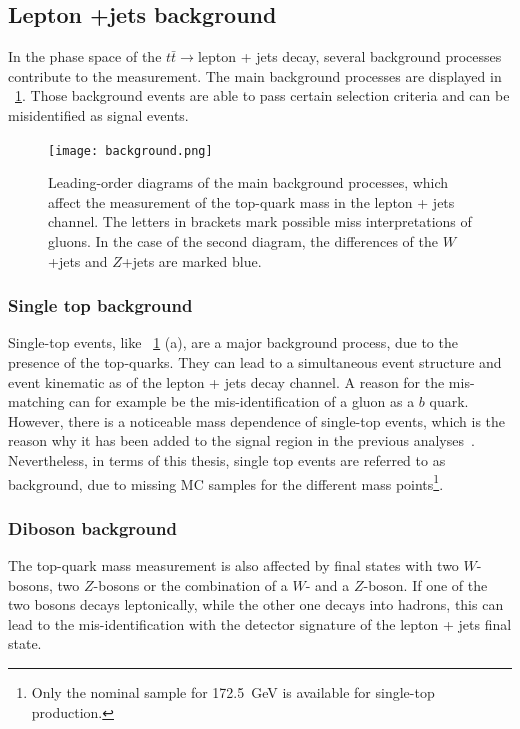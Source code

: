   
 \subsection{Lepton +jets background}
 
 
 In the phase space of the $t\bar{t} \rightarrow$lepton + jets decay, several background processes contribute to the measurement. The main background processes are displayed in ~\cref{fig:43}.  Those background events are able to pass certain selection criteria and can be misidentified as signal events. 
 

 
 \begin{figure}[h]
 	\centering
 	\texttt{[image: background.png]}
 	\caption{Leading-order diagrams of the main background processes, which affect the measurement of the top-quark mass in the lepton + jets channel.  The letters in brackets mark possible miss interpretations of gluons. In the case of the  second diagram, the differences of the $W$+jets and $Z$+jets are marked blue. } 
 	\label{fig:43}
 \end{figure}
 
 
 \subsubsection{Single top background}
 
 Single-top events, like ~\cref{fig:43} (a), are a major background process, due to the presence of the top-quarks. They can lead to a simultaneous event structure and  event kinematic as of the lepton + jets  decay channel. A reason for the mis-matching can for example be the mis-identification of a gluon as a $b$ quark.
 However, there is a noticeable mass dependence of single-top events, which is the reason why it has been added to the signal region in the previous analyses~\cite{ATLAS-CONF-2017-071, Aad:2015nba}. Nevertheless, in terms of this thesis, single top events are referred to as background, due to missing MC samples for the different mass points\footnote{Only the nominal sample for 172.5~GeV is available for single-top production.}. 
 
 \subsubsection{Diboson background}
 The top-quark mass measurement is also affected by final states with two $W$-bosons, two $Z$-bosons or the combination of a $W$- and a $Z$-boson.  If one of the two bosons decays leptonically, while the other one decays into hadrons, this can lead to the mis-identification with the detector signature of the lepton + jets final state.  
 


